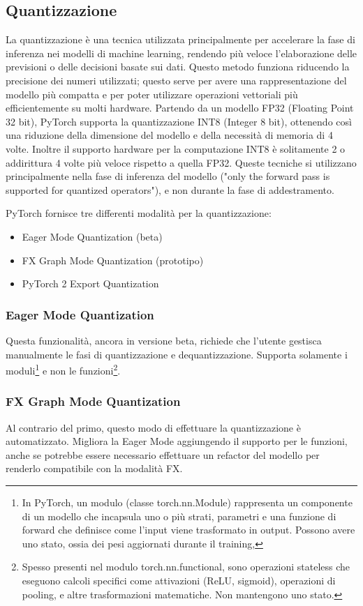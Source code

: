 \subsection{Quantizzazione}
La quantizzazione\cite{Quantizzazione} è una tecnica utilizzata principalmente per accelerare la fase di inferenza nei modelli di machine learning,
rendendo più veloce l'elaborazione delle previsioni o delle decisioni basate sui dati. Questo metodo funziona riducendo la precisione dei numeri utilizzati;
questo serve per avere una rappresentazione del modello più compatta e per poter utilizzare operazioni vettoriali più efficientemente su molti hardware.
Partendo da un modello FP32 (Floating Point 32 bit), PyTorch supporta la quantizzazione INT8 (Integer 8 bit), ottenendo così una riduzione della dimensione
del modello e della necessità di memoria di 4 volte. Inoltre il supporto hardware per la computazione INT8 è solitamente 2 o addirittura 4 volte più veloce
rispetto a quella FP32. Queste tecniche si utilizzano principalmente nella fase di inferenza del modello ("only the forward pass is supported for quantized operators"),
e non durante la fase di addestramento.

PyTorch fornisce tre differenti modalità per la quantizzazione:
\begin{itemize}
    \item Eager Mode Quantization (beta)
    \item FX Graph Mode Quantization (prototipo)
    \item PyTorch 2 Export Quantization
\end{itemize}
\subsubsection{Eager Mode Quantization}
Questa funzionalità, ancora in versione beta, richiede che l'utente gestisca manualmente le fasi di quantizzazione e dequantizzazione.
Supporta solamente i moduli\footnote{In PyTorch, un modulo (classe torch.nn.Module) rappresenta un componente di un modello che incapsula uno o più strati, parametri e una funzione di forward che definisce come l'input viene trasformato in output. Possono avere uno stato, ossia dei pesi aggiornati durante il training,}
e non le funzioni\footnote{Spesso presenti nel modulo torch.nn.functional, sono operazioni stateless che eseguono calcoli specifici come attivazioni (ReLU, sigmoid), operazioni di pooling, e altre trasformazioni matematiche. Non mantengono uno stato.}.

\subsubsection{FX Graph Mode Quantization}
Al contrario del primo, questo modo di effettuare la quantizzazione è automatizzato. Migliora la Eager Mode aggiungendo il supporto per le funzioni,
anche se potrebbe essere necessario effettuare un refactor del modello per renderlo compatibile con la modalità FX.

